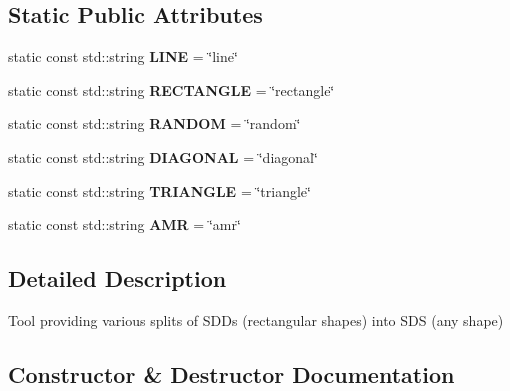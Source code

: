 \subsection*{Static Public Attributes}
\begin{DoxyCompactItemize}
\item 
\mbox{\label{classGeometry_a7e34ba00e6675a61bf3395879e542421}} 
static const std\+::string {\bfseries L\+I\+NE} = \char`\"{}line\char`\"{}
\item 
\mbox{\label{classGeometry_a8c662315a3e476bcd56119706b40cf34}} 
static const std\+::string {\bfseries R\+E\+C\+T\+A\+N\+G\+LE} = \char`\"{}rectangle\char`\"{}
\item 
\mbox{\label{classGeometry_a570649a815c4c2aa670b13b7685f5c3d}} 
static const std\+::string {\bfseries R\+A\+N\+D\+OM} = \char`\"{}random\char`\"{}
\item 
\mbox{\label{classGeometry_a458cb38fbe50085f69f68959add090f3}} 
static const std\+::string {\bfseries D\+I\+A\+G\+O\+N\+AL} = \char`\"{}diagonal\char`\"{}
\item 
\mbox{\label{classGeometry_abfa89373ed534eff19897be9e6ad9e11}} 
static const std\+::string {\bfseries T\+R\+I\+A\+N\+G\+LE} = \char`\"{}triangle\char`\"{}
\item 
\mbox{\label{classGeometry_ae7fef943c7b949fc0795116056504b2b}} 
static const std\+::string {\bfseries A\+MR} = \char`\"{}amr\char`\"{}
\end{DoxyCompactItemize}


\subsection{Detailed Description}
Tool providing various splits of S\+D\+Ds (rectangular shapes) into S\+DS (any shape) 

\subsection{Constructor \& Destructor Documentation}
\mbox{\label{classGeometry_ac7e6a2114a9969257aa18147575cd2fb}} 
